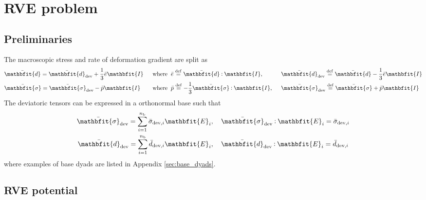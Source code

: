 \documentclass[12pt,a4paper,fleqn]{article}
\renewcommand{\ts}[1]{\mathbfit{#1}}
\begin{document}
\section{RVE problem}

\subsection{Preliminaries}
The macroscopic stress and rate of deformation gradient are split as
\begin{alignat}{3}
    &\bar{\ts d} = \bar{\ts d}_\dev + \frac{1}{3}\bar{e} \ts I
    &\;\;&\text{where}\;\; \bar{e} \defeq \bar{\ts d}\dprod \ts I,&\;\;& \bar{\ts d}_\dev \defeq \bar{\ts d} - \frac13\bar{e}\ts I \\
    &\bar{\ts\sigma} = \bar{\ts\sigma}_\dev - \bar{p} \ts I
    &\;\;&\text{where}\;\; \bar{p} \defeq -\frac13 \bar{\ts\sigma}\dprod \ts I,&\;\;& \bar{\ts\sigma}_\dev \defeq \bar{\ts\sigma} + \bar{p} \ts I
\end{alignat}
The deviatoric tensors can be expressed in a orthonormal base such that
\begin{subequations}
\begin{gather}
 \bar{\ts\sigma}_\dev = \sum_{i=1}^{n_{\mathrm{b}}} \bar{\sigma}_{\dev,i} \ts E_i,\quad \bar{\ts\sigma}_\dev \dprod \ts E_i = \bar{\sigma}_{\dev,i}
\label{eq:sigma_base} \\
 \bar{\ts d}_\dev = \sum_{i=1}^{n_{\mathrm{b}}} \bar{d}_{\dev,i} \ts E_i,\quad \bar{\ts d}_\dev \dprod \ts E_i = \bar{d}_{\dev,i}
\label{eq:d_base}
\end{gather}
\end{subequations}
where examples of base dyads are listed in Appendix \ref{sec:base_dyads}.

\subsection{RVE potential}
\end{document}
